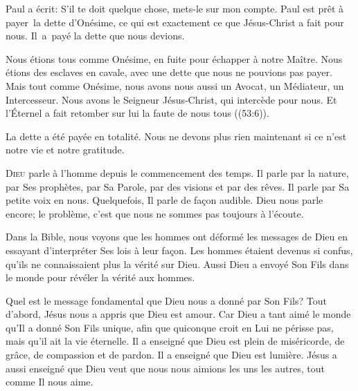 
Paul a écrit: 
 \Og S'il 
 te doit quelque chose, mets-le sur mon compte. \Fg{}
 Paul est prêt à payer~la dette d'Onésime,
 ce qui est 
 exactement ce que Jésus-Christ a fait pour nous.
 Il~a~payé la dette que nous devions. 

Nous étions tous comme Onésime, en fuite pour échapper à notre Maître.
 Nous étions des esclaves en cavale, avec une dette que nous ne pouvions
 pas payer.
 Mais tout comme Onésime, nous avons nous aussi un Avocat, un Médiateur,
 un Intercesseur. Nous avons le Seigneur Jésus-Christ,
 qui intercède pour nous.
 \Og Et l'Éternel a fait retomber sur lui la faute de nous tous \Fg{}
 ((53:6)). 

La dette a été payée en totalité.
 Nous ne devons plus rien maintenant
 \ocadr si ce n'est notre vie et notre gratitude.

\dvrule






\lettrine{D}{ieu} parle à l'homme depuis le commencement des temps.
 Il parle par la nature, par Ses prophètes, par Sa Parole, par des visions
 et par des rêves.
 Il parle par Sa petite voix en nous. Quelquefois, Il parle de fa\c{c}on audible.
 Dieu nous parle encore; le problème, c'est que nous ne sommes pas toujours
 à l'écoute. 

Dans la Bible, nous voyons que les hommes ont déformé les messages de Dieu
 en essayant d'interpréter Ses lois à leur fa\c{c}on.
 Les hommes étaient devenus si confus, qu'ils ne connaissaient plus
 la vérité sur Dieu.
 Aussi Dieu a envoyé Son Fils dans le monde
 pour révéler la vérité aux hommes. 


Quel est le message fondamental que Dieu nous a donné par Son Fils?
 Tout d'abord, Jésus nous a appris que Dieu est amour.
 \Og Car Dieu a tant aimé le monde qu'Il a donné Son Fils unique,
 afin que quiconque croit en Lui ne périsse pas, mais qu'il ait
 la vie éternelle. \Fg{}
 Il a enseigné que Dieu est plein de miséricorde, de grâce,
 de compassion et de pardon. Il a enseigné que Dieu est lumière.
 Jésus a aussi enseigné que Dieu veut que nous nous aimions
 les uns les autres, tout comme Il nous aime. 

